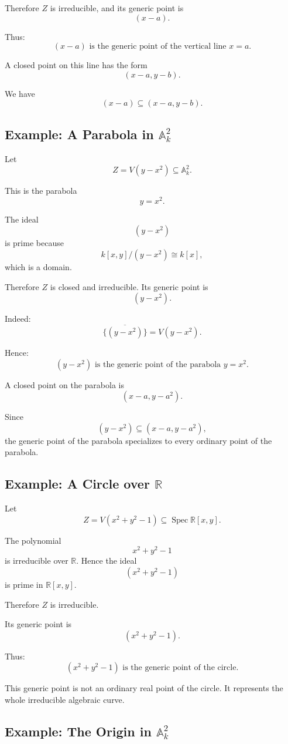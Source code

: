 \documentclass[12pt,a4paper]{article}
\theoremstyle{notespace}
\begin{document}
Therefore \(Z\) is irreducible, and its generic point is
\[
(x-a).
\]

Thus:
\[
\boxed{
	(x-a)\text{ is the generic point of the vertical line }x=a.
}
\]

A closed point on this line has the form
\[
(x-a,y-b).
\]

We have
\[
(x-a)\subseteq (x-a,y-b).
\]

\subsection{Example: A Parabola in \(\mathbb A^2_k\)}

Let
\[
Z=V(y-x^2)\subseteq \mathbb A^2_k.
\]

This is the parabola
\[
y=x^2.
\]

The ideal
\[
(y-x^2)
\]
is prime because
\[
k[x,y]/(y-x^2)\cong k[x],
\]
which is a domain.

Therefore \(Z\) is closed and irreducible. Its generic point is
\[
(y-x^2).
\]

Indeed:
\[
\overline{\{(y-x^2)\}}=V(y-x^2).
\]

Hence:
\[
\boxed{
	(y-x^2)\text{ is the generic point of the parabola }y=x^2.
}
\]

A closed point on the parabola is
\[
(x-a,y-a^2).
\]

Since
\[
(y-x^2)\subseteq (x-a,y-a^2),
\]
the generic point of the parabola specializes to every ordinary point of the parabola.

\subsection{Example: A Circle over \(\mathbb R\)}

Let
\[
Z=V(x^2+y^2-1)\subseteq \operatorname{Spec}\mathbb R[x,y].
\]

The polynomial
\[
x^2+y^2-1
\]
is irreducible over \(\mathbb R\). Hence the ideal
\[
(x^2+y^2-1)
\]
is prime in \(\mathbb R[x,y]\).

Therefore \(Z\) is irreducible.

Its generic point is
\[
(x^2+y^2-1).
\]

Thus:
\[
\boxed{
	(x^2+y^2-1)\text{ is the generic point of the circle.}
}
\]

This generic point is not an ordinary real point of the circle. It represents the whole irreducible algebraic curve.

\subsection{Example: The Origin in \(\mathbb A^2_k\)}
\end{document}
